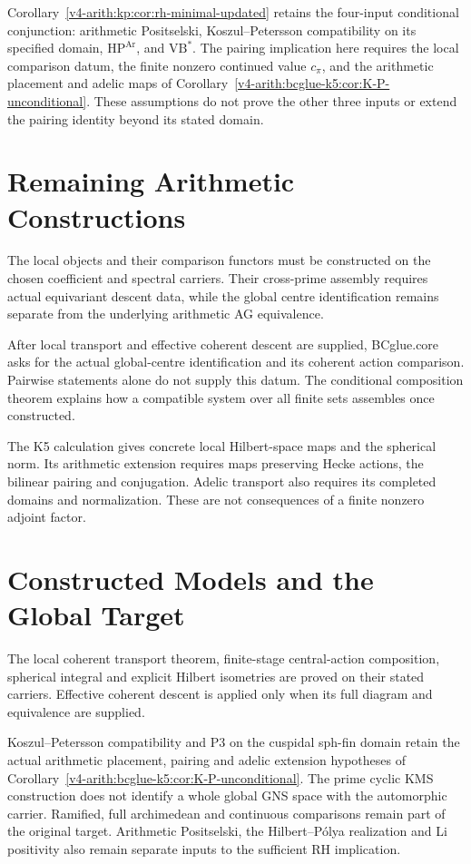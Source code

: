 \begin{remark}
\label{v4-arith:bcglue-k5:rem:RH-path-impact}
Corollary~\ref{v4-arith:kp:cor:rh-minimal-updated} retains the
four-input conditional conjunction: arithmetic Positselski,
Koszul--Petersson compatibility on its specified domain,
\(\mathrm{H\!P}^{\mathrm{Ar}}\), and \(\mathrm{VB}^{*}\).
The pairing implication here requires the local comparison datum,
the finite nonzero continued value \(c_\pi\), and the arithmetic
placement and adelic maps of
Corollary~\ref{v4-arith:bcglue-k5:cor:K-P-unconditional}.
These assumptions do not prove the other three inputs or extend
the pairing identity beyond its stated domain.
\end{remark}

\section{Remaining Arithmetic Constructions}
\label{v4-arith:bcglue-k5:residual}
The local objects and their comparison functors must be constructed
on the chosen coefficient and spectral carriers. Their cross-prime
assembly requires actual equivariant descent data, while the
global centre identification remains separate from the underlying
arithmetic AG equivalence.

\begin{remark}
\label{v4-arith:bcglue-k5:rem:residual-summary}
After local transport and effective coherent descent are supplied,
BCglue.core asks for the actual global-centre identification and its
coherent action comparison. Pairwise statements alone do not supply
this datum. The conditional composition theorem explains how a
compatible system over all finite sets assembles once constructed.

The K5 calculation gives concrete local Hilbert-space maps and the
spherical norm. Its arithmetic extension requires maps preserving
Hecke actions, the bilinear pairing and conjugation. Adelic transport
also requires its completed domains and normalization. These are
not consequences of a finite nonzero adjoint factor.
\end{remark}

\section{Constructed Models and the Global Target}
\label{v4-arith:bcglue-k5:summary}
The local coherent transport theorem, finite-stage central-action
composition, spherical integral and explicit Hilbert isometries are
proved on their stated carriers. Effective coherent descent is
applied only when its full diagram and equivalence are supplied.

Koszul--Petersson compatibility and P3 on the cuspidal sph-fin domain
retain the actual arithmetic placement, pairing and adelic extension
hypotheses of Corollary~\ref{v4-arith:bcglue-k5:cor:K-P-unconditional}.
The prime cyclic KMS construction does not identify a whole global
GNS space with the automorphic carrier. Ramified, full archimedean
and continuous comparisons remain part of the original target.
Arithmetic Positselski, the Hilbert--P\'olya realization and Li positivity
also remain separate inputs to the sufficient RH implication.
